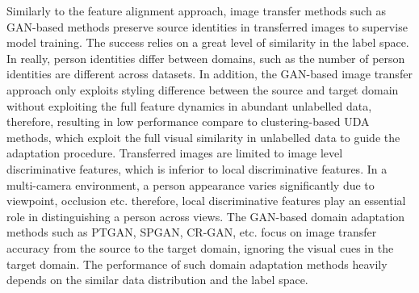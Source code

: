 \documentclass[a4paper,fleqn]{cas-dc}
\begin{document}
Similarly to the feature alignment approach, image transfer methods such as GAN-based methods preserve source identities in transferred images to supervise model training. The success relies on a great level of similarity in the label space. In really, person identities differ between domains, such as the number of person identities are different across datasets. In addition, the GAN-based image transfer approach only exploits styling difference between the source and target domain without exploiting the full feature dynamics in abundant unlabelled data, therefore, resulting in low performance compare to clustering-based UDA methods, which exploit the full visual similarity in unlabelled data to guide the adaptation procedure. Transferred images are limited to image level discriminative features, which is inferior to local discriminative features. In a multi-camera environment, a person appearance varies significantly due to viewpoint, occlusion etc. therefore, local discriminative features play an essential role in distinguishing a person across views. The GAN-based domain adaptation methods such as PTGAN, SPGAN, CR-GAN, etc. focus on image transfer accuracy from the source to the target domain, ignoring the visual cues in the target domain. The performance of such domain adaptation methods heavily depends on the similar data distribution and the label space. 
\end{document}
